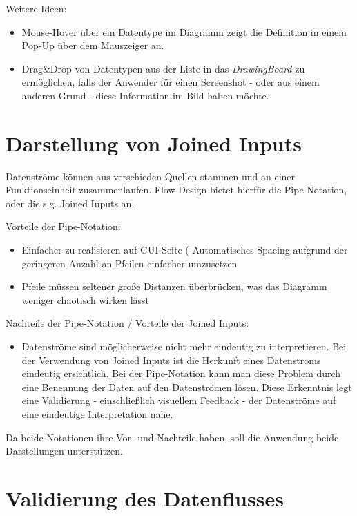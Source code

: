 Weitere Ideen: 
\begin{itemize}
\item Mouse-Hover über ein Datentype im Diagramm zeigt die Definition in einem Pop-Up
über dem Mauszeiger an.
\item Drag\&Drop von Datentypen aus der Liste in das \textit{DrawingBoard} zu
ermöglichen, falls der Anwender für einen Screenshot - oder aus einem anderen
Grund - diese Information im Bild haben möchte.
\end{itemize}


\section{Darstellung von Joined Inputs}

Datenströme können aus verschieden Quellen stammen und an einer Funktionseinheit
zusammenlaufen. Flow Design bietet hierfür die Pipe-Notation, oder die s.g. Joined Inputs an. 

\bigskip

Vorteile der Pipe-Notation:

\begin{itemize}
\item Einfacher zu realisieren auf GUI Seite ( Automatisches Spacing aufgrund der
geringeren Anzahl an Pfeilen einfacher umzusetzen
\item Pfeile müssen seltener große Distanzen überbrücken, was das Diagramm weniger
chaotisch wirken lässt
\end{itemize}

Nachteile der Pipe-Notation / Vorteile der Joined Inputs:

\begin{itemize}
\item Datenströme sind möglicherweise nicht mehr eindeutig zu interpretieren. 
Bei der Verwendung von Joined Inputs ist die Herkunft eines Datenstroms eindeutig
ersichtlich. Bei der Pipe-Notation kann man diese Problem durch eine Benennung der Daten auf den Datenströmen lösen. Diese Erkenntnis legt eine Validierung - einschließlich visuellem Feedback - der Datenströme auf eine eindeutige Interpretation nahe.
\end{itemize}

Da beide Notationen ihre Vor- und Nachteile haben, soll die Anwendung beide Darstellungen unterstützen.

\section{Validierung des Datenflusses}


